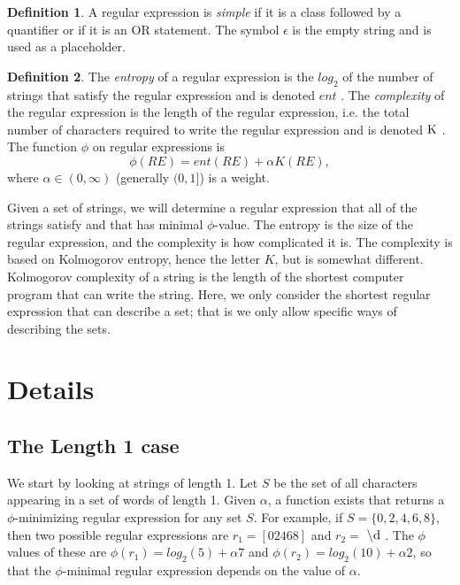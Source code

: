 \documentclass[11pt, oneside]{article}   	%
\theoremstyle{definition}
\newtheorem{definition}{Definition}
\newcommand{\dre}{$\backslash \textnormal{d}$ }
\newcommand{\K}{$ \textnormal{K}$ }
\newcommand{\entropy}{$ent$ }
\begin{document}
\begin{definition}
A regular expression is \textit{simple} if it is a class followed by a quantifier or if it is an OR statement. 
The symbol $\epsilon$ is the empty string and is used as a placeholder.
\end{definition}

\begin{definition}
The \textit{entropy} of a regular expression is the $log_2$ of the number of strings that satisfy the regular expression and is denoted \entropy. The \textit{complexity} of the regular expression is the length of the regular expression, i.e. the total number of characters required to  write the regular expression and is denoted \K. 
The function $\phi$ on regular expressions is 
\begin{equation}
\phi(RE) = ent(RE) +\alpha K(RE),
\end{equation}
where $\alpha\in(0,\infty)$ (generally $(0,1]$) is a weight.
\end{definition}

Given a set of strings, we will determine a regular expression that all of the strings satisfy and that has minimal $\phi$-value. 
The entropy is the size of the regular expression, and the complexity is how complicated it is. 
The complexity is based on Kolmogorov entropy, hence the letter $K$, but is somewhat different. 
Kolmogorov complexity of a string is the length of the shortest computer program that can write the string. 
Here, we only consider the shortest regular expression that can describe a set; that is we only allow specific ways of describing the sets. 


\section{Details}

\subsection{The Length 1 case}

We start by looking at strings of length 1. Let  $S$ be the set of all characters appearing in a set of words of length 1. 
Given $\alpha$, a function exists that returns a $\phi$-minimizing regular expression for any set $S$. 
For example, if $S = \{0,2,4,6,8\}$, then two possible regular expressions are $r_1 = [02468]$ and $r_2 = $ \dre. 
The $\phi$ values of these are $\phi(r_1) = log_2(5) + \alpha 7$ and $\phi(r_2) = log_2(10) + \alpha 2$, 
so that the $\phi$-minimal regular expression depends on the value of $\alpha$. 
\end{document}
